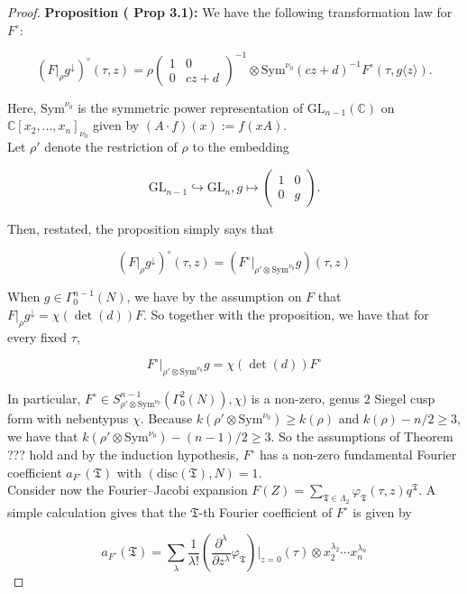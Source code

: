 \documentclass[11pt]{article}
\theoremstyle{definition}
\theoremstyle{remark}
\newcommand{\disc}{\text{disc}}
\begin{document}
\begin{proof}
{\bf Proposition (\cite{BD} Prop 3.1):} We have the following transformation law for $F^\circ$:

\[
(F \vert_\rho g^{\downarrow})^\circ (\tau,z) = \rho \begin{pmatrix} 1 & 0 \\ 0 & cz+d \end{pmatrix}^{-1} \otimes \text{Sym}^{\nu_0}(cz+d)^{-1} F^\circ (\tau, g \langle z \rangle). 
\]

Here, $\text{Sym}^{\nu_0}$ is the symmetric power representation of $\text{GL}_{n-1}(\mathbb{C})$ on $\mathbb{C}[x_2,...,x_n]_{\nu_0}$ given by $(A \cdot f)(x) := f(xA)$. \\

Let $\rho'$ denote the restriction of $\rho$ to the embedding 

\[
\text{GL}_{n-1} \hookrightarrow \text{GL}_{n}, g \mapsto \begin{pmatrix} 1 & 0 \\ 0 & g \end{pmatrix}.
\]

Then, restated, the proposition simply says that 

\[
(F \vert_\rho g^{\downarrow})^\circ (\tau, z) = (F^\circ \vert_{\rho' \otimes \text{Sym}^{\nu_0}} g)(\tau, z)
\]

When $g \in \Gamma_0^{n-1}(N)$, we have by the assumption on $F$ that $F \vert_\rho g^{\downarrow} = \chi(\det(d)) F$. So together with the proposition, we have that for every fixed $\tau$, 

\[
F^\circ \vert_{\rho' \otimes \text{Sym}^{\nu_0}} g = \chi(\det(d)) F^\circ
\]

In particular, $F^\circ \in S_{\rho' \otimes \text{Sym}^{\nu_0}}^{n-1}(\Gamma_0^{2}(N)), \chi)$ is a non-zero, genus $2$ Siegel cusp form with nebentypus $\chi$. Because $k(\rho' \otimes \mathrm{Sym}^{\nu_0}) \geq k(\rho)$ and $k(\rho) - n/2 \geq 3$, we have that $k(\rho' \otimes \mathrm{Sym}^{\nu_0}) - (n-1)/2 \geq 3$. So the assumptions of Theorem ??? hold and by the induction hypothesis, $F^\circ$ has a non-zero fundamental Fourier coefficient $a_{F^\circ}(\mathfrak{T})$ with $(\disc(\mathfrak{T}),N) = 1$. \\

Consider now the Fourier--Jacobi expansion $F(Z) = \sum_{\mathfrak{T} \in \Lambda_2} \varphi_{\mathfrak{T}}(\tau, z) q^\mathfrak{T}$. A simple calculation gives that the $\mathfrak{T}$-th Fourier coefficient of $F^\circ$ is given by 

\[
a_{F^\circ}(\mathfrak{T}) = \sum_\lambda \frac{1}{\lambda!}\left(\frac{\partial^\lambda}{\partial z^\lambda}\varphi_{\mathfrak{T}}\right) \vert_{z = 0}(\tau) \otimes x_2^{\lambda_2} \cdots x_n^{\lambda_n}
\]


\end{proof}
\end{document}
